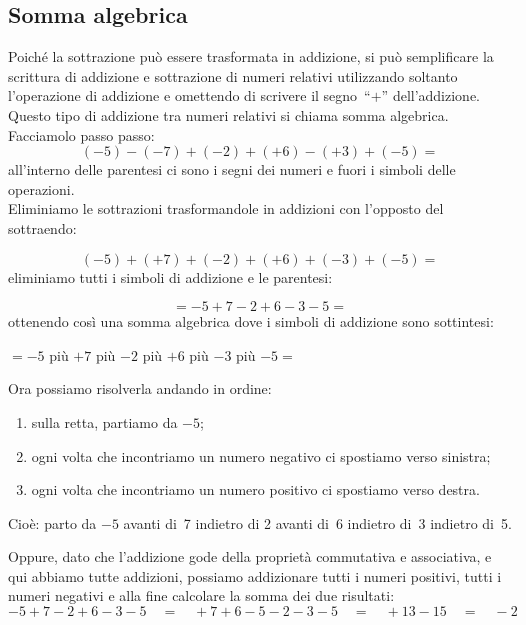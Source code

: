 \subsection{Somma algebrica}

Poiché la sottrazione può essere trasformata in addizione, si può 
semplificare la scrittura di addizione e sottrazione di numeri relativi 
utilizzando soltanto l'operazione di addizione e omettendo di scrivere
il segno~``\(+\)'' dell'addizione. 
Questo tipo di addizione tra numeri relativi si chiama somma algebrica.
Facciamolo passo passo:
\[(-5)-(-7)+(-2)+(+6)-(+3)+(-5) =\]
all'interno delle parentesi ci sono i segni dei numeri e fuori i simboli 
delle operazioni.\\
Eliminiamo le sottrazioni trasformandole in addizioni 
con l'opposto del sottraendo:

\vspace{-1em}
\[(-5)+(+7)+(-2)+(+6)+(-3)+(-5) =\]
eliminiamo tutti i simboli di addizione e le parentesi: 

\vspace{-1em}
\[=-5+7-2+6-3-5 =\]
ottenendo così una somma algebrica dove i simboli di addizione sono 
sottintesi: 

\vspace{-.5em}
\begin{center}
\(= -5\) \quad più \(+7\) \quad più \(-2\) \quad più \(+6\) 
\quad più \(-3\) \quad più \(-5 =\)\\
\end{center}


\bigskip
Ora possiamo risolverla andando in ordine:
\begin{enumerate} [nosep]
\item sulla retta, partiamo da \(-5\);
\item ogni volta che incontriamo un numero negativo ci spostiamo verso 
sinistra; 
\item ogni volta che incontriamo un numero positivo ci spostiamo verso 
destra.
\end{enumerate}

\sommalgebrica

Cioè: parto da \(-5\) avanti di~7 indietro di 2 avanti di~6 indietro 
di~3 indietro di~5.

Oppure, dato che l'addizione gode della proprietà commutativa e associativa, 
e qui abbiamo tutte addizioni,
possiamo addizionare tutti i numeri positivi, tutti i numeri negativi e alla 
fine calcolare la somma dei due risultati:
\[-5+7-2+6-3-5 \quad=\quad +7+6-5-2-3-5 \quad=\quad +13 -15 \quad=\quad -2\]


